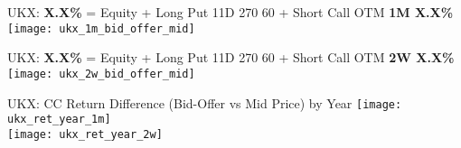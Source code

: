 \documentclass{beamer}
\begin{document}
\begin{frame}{\small UKX: {\bf X.X\%} = Equity + Long Put 11D 270 60 + Short Call OTM {\bf 1M X.X\%}}
\texttt{[image: ukx\_1m\_bid\_offer\_mid]}
\end{frame}
\begin{frame}{\small UKX: {\bf X.X\%} = Equity + Long Put 11D 270 60 + Short Call OTM {\bf 2W X.X\%}}
\texttt{[image: ukx\_2w\_bid\_offer\_mid]}
\end{frame}

\begin{frame}{\normalsize UKX: CC Return Difference (Bid-Offer vs Mid Price) by Year}
\texttt{[image: ukx\_ret\_year\_1m]} \\
\texttt{[image: ukx\_ret\_year\_2w]}
\end{frame}
\end{document}
